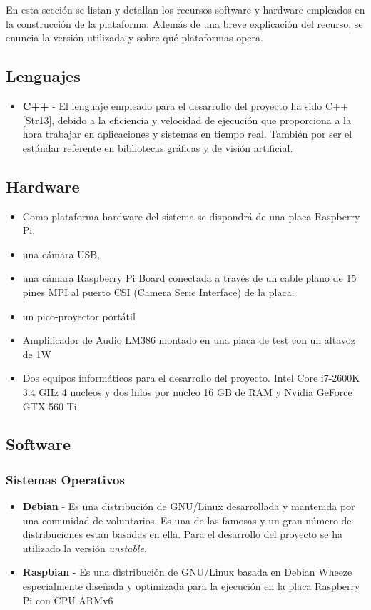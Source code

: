 En esta sección se listan y detallan los recursos software y hardware empleados en la construcción de la plataforma. Además de una breve explicación del recurso, se enuncia la versión utilizada y sobre qué plataformas opera.

\subsection{Lenguajes}
\begin{itemize}
\item \textbf{C++} - El lenguaje empleado para el desarrollo del proyecto ha sido C++ [Str13], debido a la eficiencia y velocidad de ejecución que proporciona a la hora trabajar en aplicaciones y sistemas en tiempo real. También por ser el estándar referente en bibliotecas gráficas y de visión artificial.
\end{itemize}

\subsection{Hardware}
\begin{itemize}
\item Como plataforma hardware del sistema se dispondrá de una placa Raspberry Pi, 
\item una cámara USB, 
\item una cámara Raspberry Pi Board conectada a través de un cable plano de 15 pines MPI al puerto CSI (Camera Serie Interface) de la placa.
\item un pico-proyector portátil 
\item Amplificador de Audio LM386 montado en una placa de test con un altavoz de 1W
\item Dos equipos informáticos para el desarrollo del proyecto. Intel Core i7-2600K 3.4 GHz 4 nucleos y dos hilos por nucleo 16 GB de RAM y Nvidia GeForce GTX 560 Ti

\end{itemize}

\subsection{Software}
\subsubsection{Sistemas Operativos}

\begin{itemize}
\item \textbf{Debian} - Es una distribución de GNU/Linux desarrollada y mantenida por una comunidad de voluntarios. Es una de las famosas y un gran número de distribuciones estan basadas en ella. Para el desarrollo del proyecto se ha utilizado la versión \emph{unstable}. 

\item \textbf{Raspbian} - Es una distribución de GNU/Linux basada en Debian Wheeze especialmente diseñada y optimizada para la ejecución en la placa Raspberry Pi con  CPU ARMv6   
\end{itemize}

